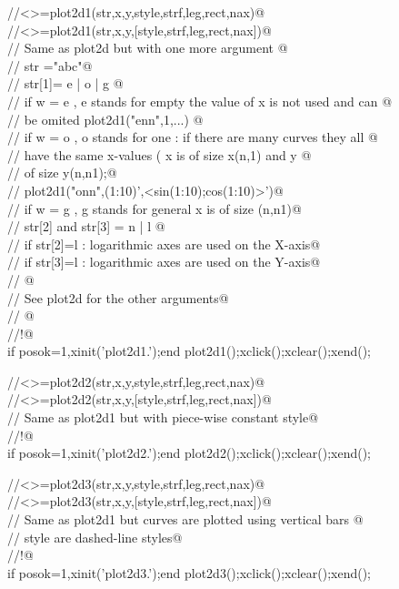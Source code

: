 
\verb@//<>=plot2d1(str,x,y,style,strf,leg,rect,nax)@ \\
\verb@//<>=plot2d1(str,x,y,[style,strf,leg,rect,nax])@ \\
\verb@// Same as plot2d but with one more argument @ \\
\verb@// str ="abc"@ \\
\verb@//   str[1]= e | o | g @ \\
\verb@//      if w = e  , e stands for empty the value of x is not used and can @ \\
\verb@//                    be omited  plot2d1("enn",1,...)   @ \\
\verb@//      if w = o  , o stands for one : if there are many curves they all @ \\
\verb@//                    have the same x-values ( x is of size x(n,1) and y @ \\
\verb@//                    of size y(n,n1);@ \\
\verb@//		      plot2d1("onn",(1:10)',<sin(1:10);cos(1:10)>')@ \\
\verb@//	if w = g  , g stands for general x is of size (n,n1)@ \\
\verb@//   str[2] and str[3] = n | l @ \\
\verb@//                  if str[2]=l : logarithmic axes are used on the X-axis@ \\
\verb@//                  if str[3]=l : logarithmic axes are used on the Y-axis@ \\
\verb@//	@ \\
\verb@//   See plot2d for the other arguments@ \\
\verb@// @ \\
\verb@//!@ \\
if posok=1,xinit('plot2d1.');end
plot2d1();xclick();xclear();xend();


\verb@//<>=plot2d2(str,x,y,style,strf,leg,rect,nax)@ \\
\verb@//<>=plot2d2(str,x,y,[style,strf,leg,rect,nax])@ \\
\verb@// Same as plot2d1 but with piece-wise constant style@ \\
\verb@//!@ \\
if posok=1,xinit('plot2d2.');end
plot2d2();xclick();xclear();xend();



\verb@//<>=plot2d3(str,x,y,style,strf,leg,rect,nax)@ \\
\verb@//<>=plot2d3(str,x,y,[style,strf,leg,rect,nax])@ \\
\verb@// Same as plot2d1 but curves are plotted using vertical bars @ \\
\verb@// style are dashed-line styles@ \\
\verb@//!@ \\
if posok=1,xinit('plot2d3.');end
plot2d3();xclick();xclear();xend();

